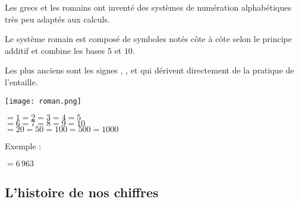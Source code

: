 \begin{His}
Les grecs et les romains ont inventé des systèmes de numération alphabétiques très peu adaptés aux calculs.

Le système romain est composé de symboles notés côte à côte selon le principe additif et combine les bases $5$ et $10$.

Les plus anciens sont les signes , , et  qui dérivent directement de la pratique de l'entaille.

\begin{center}
\texttt{[image: roman.png]}
\end{center}

\begin{center}
$=1$\hspace{.5cm}$=2$\hspace{.5cm}$=3$\hspace{.5cm}$=4$\hspace{.5cm}$=5$\\
$=6$\hspace{.5cm}$=7$\hspace{.5cm}$=8$\hspace{.5cm}$=9$\hspace{.5cm}$=10$\\
$=20$\hspace{.5cm}$=50$\hspace{.5cm}$=100$\hspace{.5cm}$=500$\hspace{.5cm}$=1000$
\end{center}

Exemple :
\begin{center}
$=6\,963$
\end{center}
\end{His}

\subsection{L'histoire de nos chiffres}

